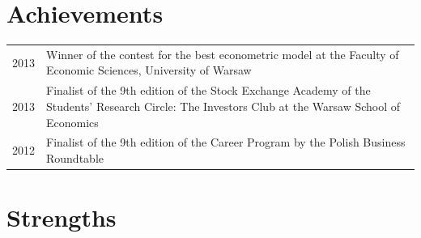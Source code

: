 \documentclass{cls/gml_cv_sets}
\begin{document}
\begin{paracol}{2}
\vspace{-0.5cm}
\begin{minipage}[t]{0.6\textwidth}
    \section{Achievements}
    \begin{tabular}{>{\footnotesize}r >{\footnotesize}p{}}
        2013 & Winner of the contest for the best econometric model at the 
        Faculty of Economic Sciences, University of Warsaw \\
        2013 & Finalist of the 9th edition of the Stock Exchange Academy of 
        the Students' Research Circle: The Investors Club at the Warsaw 
        School of Economics \\
        2012 & Finalist of the 9th edition of the Career Program by the 
        Polish Business Roundtable
    \end{tabular}
\end{minipage}

\section{Strengths}
\begin{center}
\end{center}

\clearpage
\end{paracol}
\end{document}
